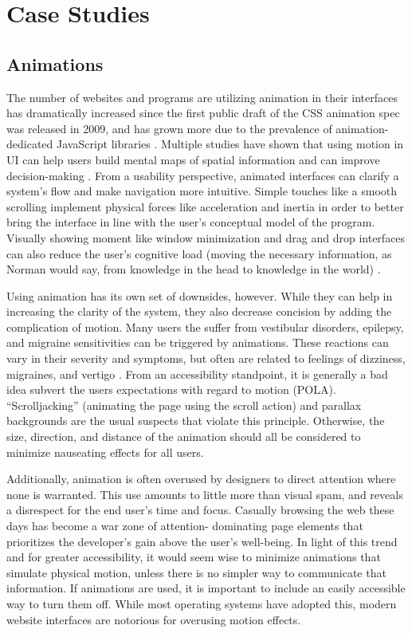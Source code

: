 \documentclass[12pt, oneside]{article}
\begin{document}
\section{Case Studies}

\subsection{Animations}

The number of websites and programs are utilizing animation in their interfaces has dramatically increased since the first public draft of the CSS animation spec was released in 2009, and has grown more due to the prevalence of animation-dedicated JavaScript libraries \cite{trends}. Multiple studies have shown that using motion in UI can help users build mental maps of spatial information and can improve decision-making \cite{bederson_boltman_1999} \cite{gonzalez_1996}. From a usability perspective, animated interfaces can clarify a system's flow and make navigation more intuitive. Simple touches like a smooth scrolling implement physical forces like acceleration and inertia in order to better bring the interface in line with the user's conceptual model of the program. Visually showing moment like window minimization and drag and drop interfaces can also reduce the user's cognitive load (moving the necessary information, as Norman would say, from knowledge in the head to knowledge in the world) \cite[p.~74]{norman_2013}.

Using animation has its own set of downsides, however. While they can help in increasing the clarity of the system, they also decrease concision by adding the complication of motion. Many users the suffer from vestibular disorders, epilepsy, and migraine sensitivities can be triggered by animations. These reactions can vary in their severity and symptoms, but often are related to feelings of dizziness, migraines, and vertigo \cite{head_2015}. From an accessibility standpoint, it is generally a bad idea subvert the users expectations with regard to motion (POLA). ``Scrolljacking'' (animating the page using the scroll action) and parallax backgrounds are the usual suspects that violate this principle. Otherwise, the size, direction, and distance of the animation should all be considered to minimize nauseating effects for all users.

Additionally, animation is often overused by designers to direct attention where none is warranted. This use amounts to little more than visual spam, and reveals a disrespect for the end user's time and focus. Casually browsing the web these days has become a war zone of attention- dominating page elements that prioritizes the developer's gain above the user's well-being. In light of this trend and for greater accessibility, it would seem wise to minimize animations that simulate physical motion, unless there is no simpler way to communicate that information. If animations are used, it is important to include an easily accessible way to turn them off. While most operating systems have adopted this, modern website interfaces are notorious for overusing motion effects.
\end{document}

